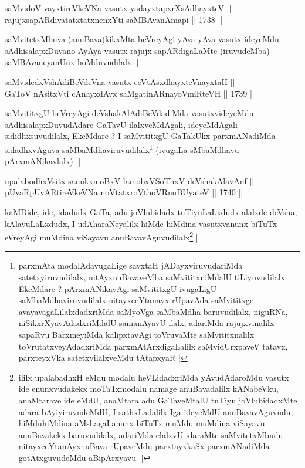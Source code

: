 \begin{shl}
saMvidoV vayxtireVkeVNa vasutx yadayxtapxrXsAdhayxteV || \\
rajujxsapARdivatatxtatxnenxYti saMBAvanAmapi ||  1738 ||  
\end{shl}

\begin{artha}
saMvitetxMbuva (anuBava)kikxMta beVreyAgi yAva yAva vasutx ideyeMdu
sAdhisalapxDuvano AyAya vasutx rajujx sapARdigaLaMte (iruvudeMba)
saMBAvaneyanUnx hoMduvudilalx ||
\end{artha}

\begin{shl}
saMvidedxVshAdiBeVdeVna vasutx ceVtAsxdhayxteV\s nayxtaH || \\
GaToV nAsitxVti cAnayxdAvx saMgatinARnayoVmiRteVH ||  1739 || 
\end{shl}

\begin{artha}
saMvititxgU beVreyAgi deVshakAlAdiBeVdadiMda vasutxvideyeMdu
sAdhisalapxDuvudAdare GaTavU ilalxveMdAgali, ideyeMdAgali
sididhxsuvudilalx, EkeMdare ? I saMvititxgU GaTakUkx parxmANadiMda
sidadhxvAguva saMbaMdhaviruvudilalx\footnote[1]{parxmAta
  modalAdavugaLige savxtaH jADayxviruvudariMda satetxyiruvudilalx,
  nitAyxnuBavaveMba saMvititxniMdalU tiLiyuvudilalx EkeMdare ?
  pArxmANikavAgi saMvititxgU ivugaLigU saMbaMdhaviruvudilalx
  nitayxceYtanayx rUpavAda saMvititxge avayavagaLilalxdadxriMda
  saMyoVga saMbaMdha baruvudilalx, niguRNa, niSikxrXyavAdadxriMdalU
  samanAyavU ilalx, adariMda rajujxvinalilx sapaRvu BarxmeyiMda
  kalipxtavAgi toVruvaMte saMvititxnalilx toVrutatxveyAdadxriMda
  parxmAtArxdigaLalilx saMvidUrxpaveV tatavx, parxteyxVka
  satetxyilalxveMdu tAtapxyaR  |} (ivugaLa sMbaMdhavu
pArxmANikavlalx) || 
\end{artha}


\begin{shl}
upalabodhxV\s sitx sanukxmoBxV lamobxVSoThxV deVshakAlavAnf ||  \\
pUvaRpUvARtireVkeVNa noVtatxroV\s thoVR\s nuBUyateV ||  1740 ||  
\end{shl}

\begin{artha}
kaMDide, ide, idadudx GaTa, adu joVlubidadx tuTiyuLaLxdudx alalxde
deVsha, kAlavuLaLxdudx, I udAharaNeyalilx hiMde hiMdina vasutxvanunx
biTuTx eVreyAgi muMdina viSayavu anuBavavAguvudilalx\footnote[2]{ililx
upalabadhxH eMdu modalu heVLidadxriMda yAvudAdaroMdu vasutx ide
enunxvudakekx moTaTxmodalu namage anuBavadalilx kANabeVku, anaMtarave
ide eMdU, anaMtara adu GaTaveMtalU tuTiyu joVlubidadxMte adara
bAyiyiruvudeMdU, I sathxLadalilx Iga ideyeMdU anuBavavAguvudu,
hiMduhiMdina aMshagaLanunx biTuTx muMdu muMdina viSayavu anuBavakekx
baruvudilalx, adariMda elalxvU idaraMte saMvitetxMbudu
nitayxceYtanAyxnuBava rUpaveMdu parxtayxkaSx parxmANadiMda
gotAtxguvudeMdu aBipArxyavu ||} ||
\end{artha}

